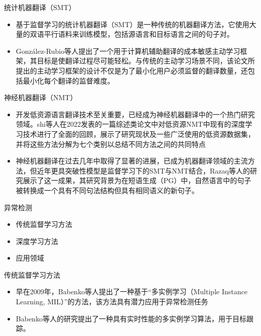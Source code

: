 \documentclass[UTF8]{beamer}
\begin{document}
\begin{frame}{统计机器翻译（SMT）}
    \begin{itemize}
        \item 基于监督学习的统计机器翻译（SMT）是一种传统的机器翻译方法，它使用大量的双语平行语料来训练模型，包括源语言和目标语言之间的句子对。
        \item González-Rubio等人提出了一个用于计算机辅助翻译的成本敏感主动学习框架，其目标是使翻译过程尽可能轻松。与传统的主动学习场景不同，该论文所提出的主动学习框架的设计不仅是为了最小化用户必须监督的翻译数量，还包括最小化每个翻译的监督难度。
    \end{itemize}
\end{frame}

\begin{frame}{神经机器翻译（NMT）}
    \scriptsize
    \begin{itemize}
        \item 开发低资源语言翻译技术至关重要，已经成为神经机器翻译中的一个热门研究领域。shi等人在2022发表的一篇综述类论文中对低资源NMT中现有的深度学习技术进行了全面的回顾，展示了研究现状及一些广泛使用的低资源数据集，并将这些方法分解为七个类别以总结不同方法之间的共同特点
        \item 神经机器翻译在过去几年中取得了显著的进展，已成为机器翻译领域的主流方法，但近年更具突破性模型是监督学习下的SMT与NMT结合，Razaq等人的研究展示了这一成果，其研究背景为在短语生成（PG）中，自然语言中的句子被转换成一个具有不同句法结构但具有相同语义的新句子。
    \end{itemize}
\end{frame}

\begin{frame}{异常检测}
    \begin{itemize}
        \item 传统监督学习方法
        \item 深度学习方法
        \item 应用领域
    \end{itemize}
\end{frame}

\begin{frame}{传统监督学习方法}
    \begin{itemize}
        \item 早在2009年，Babenko等人提出了一种基于“多实例学习（Multiple Instance Learning, MIL）”的方法，该方法具有潜力应用于异常检测任务
        \item Babenko等人的研究提出了一种具有实时性能的多实例学习算法，用于目标跟踪。
    \end{itemize}
\end{frame}
\end{document}
